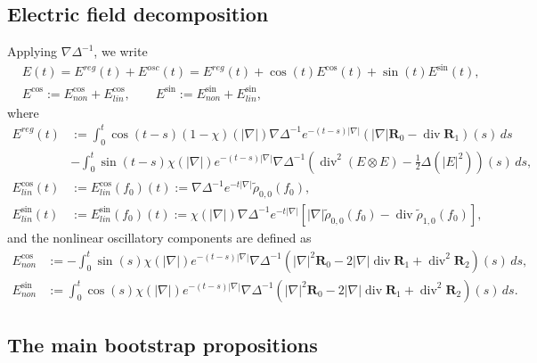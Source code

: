 \documentclass[reqno,11pt]{amsart}
\numberwithin{equation}{section}
\begin{document}
	\subsection{Electric field decomposition}
	Applying $\nabla\Delta^{-1}$, we write
	\begin{equation}\label{de1}
		\begin{split}
			&E(t)=	E^{reg}(t)+E^{osc}(t)=E^{reg}(t)+\cos(t) E^{\cos}(t)+\sin(t)E^{\sin}(t),\\
			&E^{\cos}:=E^{\cos}_{non}+E_{lin}^{\cos},\qquad E^{\sin}:=E^{\sin}_{non}+E_{lin}^{\sin},
		\end{split}
	\end{equation}
	where
	\begin{equation}\label{de1.1}
		\begin{split}
			E^{reg}(t)&:=\int_{0}^{t}\cos(t-s)(1-\chi)(|\nabla|)\nabla\Delta^{-1}e^{-(t-s)|\nabla|} (|\nabla|\mathbf{R}_0-\operatorname{div}\mathbf{R}_1)(s)\,ds\\
			&-	\int_{0}^{t}\sin(t-s)\chi(|\nabla|)e^{-(t-s)|\nabla|}\nabla\Delta^{-1} (\operatorname{div}^2(E\otimes E)-\frac{1}{2}\Delta(| E|^2))(s)\,ds,\\
			E_{lin}^{\cos}(t)&:=	E_{lin}^{\cos}(f_0)(t):=\nabla\Delta^{-1}e^{-t|\nabla|} \tilde\rho_{0,0}(f_0),\\
			E_{lin}^{\sin}(t)&:=	E_{lin}^{\sin}(f_0)(t):=\chi(|\nabla|)\nabla\Delta^{-1}e^{-t|\nabla|} [|\nabla|\tilde\rho_{0,0}(f_0)-\operatorname{div}\tilde{\rho}_{1,0}(f_0)],
		\end{split}
	\end{equation}
	and the nonlinear oscillatory components are defined as
	\begin{equation}\label{z40.4}
		\begin{split}
			E^{\cos}_{non}&:=-\int_{0}^{t}\sin(s)\chi(|\nabla|)e^{-(t-s)|\nabla|} \nabla\Delta^{-1}(|\nabla|^2\mathbf{R}_0-2|\nabla|\operatorname{div}\mathbf{R}_1+\operatorname{div}^2\mathbf{R}_2)(s)\,ds,\\
			E^{\sin}_{non}&:=\int_{0}^{t}\cos(s)\chi(|\nabla|)e^{-(t-s)|\nabla|} \nabla\Delta^{-1}(|\nabla|^2\mathbf{R}_0-2|\nabla|\operatorname{div}\mathbf{R}_1+\operatorname{div}^2\mathbf{R}_2)(s)\,ds.
		\end{split}
	\end{equation}
	
	\subsection{The main bootstrap propositions}
	
\end{document}
